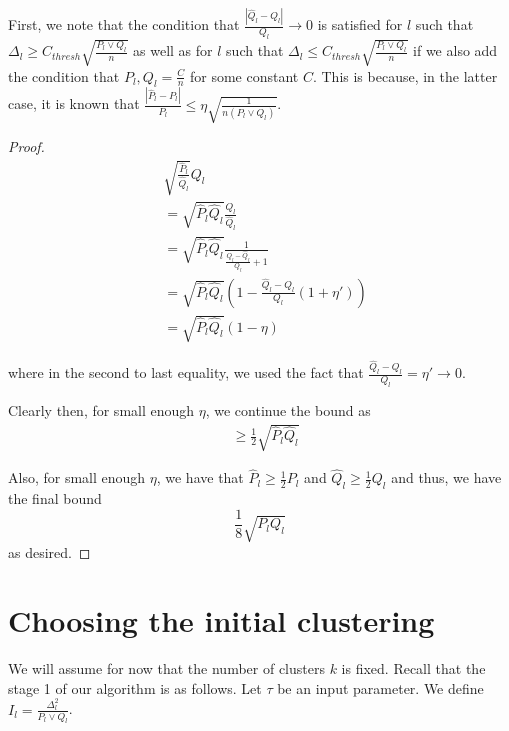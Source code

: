 \documentclass{article}
\begin{document}
First, we note that the condition that $\frac{|\hat{Q}_l - Q_l|}{Q_l} \rightarrow 0$ is satisfied for $l$ such that $\Delta_l \geq C_{thresh}\sqrt{\frac{P_l \vee Q_l}{n}}$ as well as for $l$ such that $\Delta_l \leq C_{thresh} \sqrt{\frac{P_l \vee Q_l}{n}}$ if we also add the condition that $P_l, Q_l = \frac{C}{n}$ for some constant $C$. This is because, in the latter case, it is known that $\frac{|\hat{P}_l - P_l| }{P_l} \leq \eta \sqrt{\frac{1}{n (P_l \vee Q_l)}}$. 

\begin{proof}


\begin{align*}
& \sqrt{\frac{\hat{P}_l}{\hat{Q}_l} } Q_l \\
&= \sqrt{ \hat{P}_l \hat{Q}_l} \frac{Q_l}{\hat{Q}_l} \\
&= \sqrt{\hat{P}_l \hat{Q}_l} \frac{1}{ \frac{Q_l - \hat{Q}_l}{Q_l} + 1 } \\
&= \sqrt{\hat{P}_l \hat{Q}_l} 
  \left( 1 - \frac{\hat{Q}_l - Q_l}{Q_l} (1 + \eta') \right)  \\
&= \sqrt{\hat{P}_l \hat{Q}_l} (1 - \eta)
\end{align*}

where in the second to last equality, we used the fact that $\frac{\hat{Q}_l - Q_l}{Q_l} = \eta' \rightarrow 0$. 

Clearly then, for small enough $\eta$, we continue the bound as 
\begin{align*}
&\geq \frac{1}{2} \sqrt{ \hat{P}_l \hat{Q}_l} 
\end{align*}

Also, for small enough $\eta$, we have that $\hat{P}_l \geq \frac{1}{2} P_l$ and $\hat{Q}_l \geq \frac{1}{2} Q_l$ and thus, we have the final bound
\[
\frac{1}{8} \sqrt{ P_l Q_l}
\]
as desired. 

\end{proof}





\newpage
\section{Choosing the initial clustering}
\label{sec:initial_clustering}

We will assume for now that the number of clusters $k$ is fixed. Recall that the stage 1 of our algorithm is as follows. Let $\tau$ be an input parameter. We define $I_l = \frac{\Delta_l^2 }{P_l \vee Q_l}$. 
\end{document}
